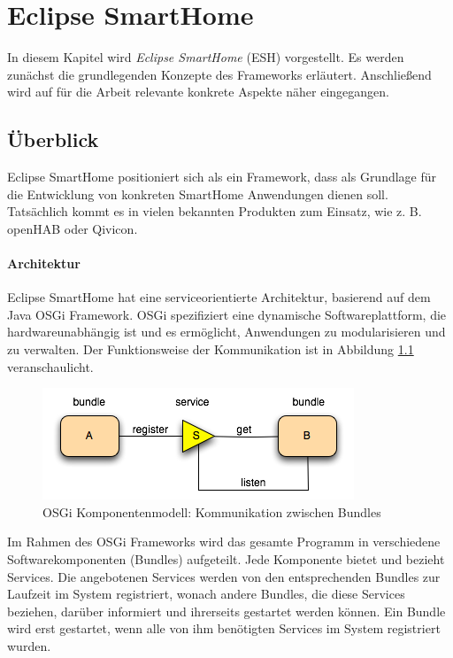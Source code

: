 \chapter{Eclipse SmartHome}
\label{chap:esh}
In diesem Kapitel wird \textit{Eclipse SmartHome} (ESH) \cite{ESH:home} vorgestellt. Es werden zunächst die grundlegenden Konzepte des Frameworks erläutert. Anschließend wird auf für die Arbeit relevante konkrete Aspekte näher eingegangen.

\section{Überblick}
Eclipse SmartHome positioniert sich als ein Framework, dass als Grundlage für die Entwicklung von konkreten SmartHome Anwendungen dienen soll. Tatsächlich kommt es in vielen bekannten Produkten zum Einsatz, wie z. B. openHAB\cite{openHAB} oder Qivicon\cite{qivicon}.


\subsubsection{Architektur}
Eclipse SmartHome hat eine serviceorientierte Architektur, basierend auf dem Java OSGi Framework\cite{osgibook}. OSGi spezifiziert eine dynamische Softwareplattform, die hardwareunabhängig ist und es ermöglicht, Anwendungen zu modularisieren und zu verwalten. Der Funktionsweise der Kommunikation ist in Abbildung \ref{fig:osgi} veranschaulicht.

\begin{figure}[h]
	\centering
	\includegraphics{bilder/osgi}
	\caption{OSGi Komponentenmodell: Kommunikation zwischen Bundles \cite{osgi:whatisit}}
	\label{fig:osgi}
\end{figure}

Im Rahmen des OSGi Frameworks wird das gesamte Programm in verschiedene Softwarekomponenten (Bundles) aufgeteilt. Jede Komponente bietet und bezieht Services. Die angebotenen Services werden von den entsprechenden Bundles zur Laufzeit im System registriert, wonach andere Bundles, die diese Services beziehen, darüber informiert und ihrerseits gestartet werden können. Ein Bundle wird erst gestartet, wenn alle von ihm benötigten Services im System registriert wurden.\\

